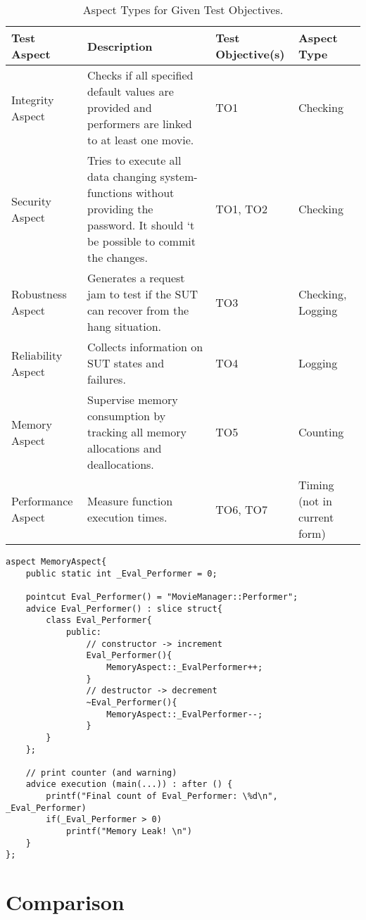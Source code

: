 \begin{table}[h]
\begin{small}
\caption{Aspect Types for Given Test Objectives.}
\begin{tabular}{>{\raggedright}p{2cm}|p{8cm}|p{1cm}|p{2cm}}
\hline
\textbf{Test \quad Aspect} & \textbf{Description} & \textbf{Test Objective(s)} & \textbf{Aspect Type}\\
\hline
Integrity Aspect & Checks if all specified default values are provided and performers are linked to at least one movie. & TO1 & Checking \\
\hline
Security Aspect & Tries to execute all data changing system-functions without providing the password. It should ‘t be possible to commit the changes. & TO1, TO2 & Checking\\
\hline
Robustness Aspect & Generates a request jam to test if the SUT can recover from the hang situation. & TO3 & Checking, Logging\\
\hline
Reliability Aspect & Collects information on SUT states and failures. & TO4 & Logging\\
\hline
Memory Aspect & Supervise memory consumption by tracking all memory allocations and deallocations. & TO5 & Counting\\
\hline
Performance Aspect & Measure function execution times. & TO6, TO7 & Timing (not in current form)\\
\hline
\end{tabular}
\label{aspect-test}
\end{small}
\end{table}

\lstset {language=C++}
\begin{lstlisting}[caption={\textbf{Generated Counter Aspect Code.}}, label=mem]
aspect MemoryAspect{
	public static int _Eval_Performer = 0;

	pointcut Eval_Performer() = "MovieManager::Performer";
	advice Eval_Performer() : slice struct{
		class Eval_Performer{
			public:
				// constructor -> increment
				Eval_Performer(){
					MemoryAspect::_EvalPerformer++;
				}
				// destructor -> decrement
				~Eval_Performer(){
					MemoryAspect::_EvalPerformer--;
				} 
		} 
	};

	// print counter (and warning)
	advice execution (main(...)) : after () {
		printf("Final count of Eval_Performer: \%d\n",  _Eval_Performer)
		if(_Eval_Performer > 0)
			printf("Memory Leak! \n")
	}
};
\end{lstlisting}


\section{Comparison} \label{compare}

